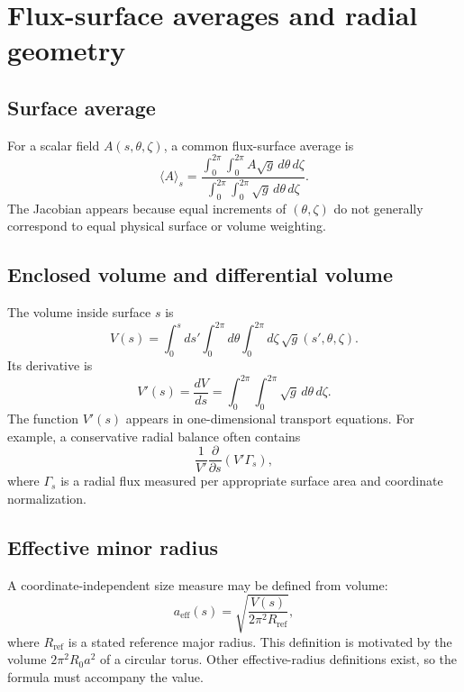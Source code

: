 \section{Flux-surface averages and radial geometry}
\label{sec:surface_averages}

\subsection{Surface average}
For a scalar field $A(s,\theta,\zeta)$, a common flux-surface average is
\begin{equation}
\langle A\rangle_s
=\frac{\displaystyle\int_0^{2\pi}\int_0^{2\pi}A\sqrt{g}\,d\theta\,d\zeta}
{\displaystyle\int_0^{2\pi}\int_0^{2\pi}\sqrt{g}\,d\theta\,d\zeta}.
\label{eq:flux_surface_average}
\end{equation}
The Jacobian appears because equal increments of $(\theta,\zeta)$ do not generally correspond to equal physical surface or volume weighting.

\subsection{Enclosed volume and differential volume}
The volume inside surface $s$ is
\begin{equation}
V(s)=\int_0^s ds'\int_0^{2\pi}d\theta\int_0^{2\pi}d\zeta\,\sqrt{g}(s',\theta,\zeta).
\label{eq:enclosed_volume}
\end{equation}
Its derivative is
\begin{equation}
V'(s)=\frac{dV}{ds}
=\int_0^{2\pi}\int_0^{2\pi}\sqrt{g}\,d\theta\,d\zeta.
\label{eq:Vprime}
\end{equation}
The function $V'(s)$ appears in one-dimensional transport equations. For example, a conservative radial balance often contains
\begin{equation}
\frac{1}{V'}\frac{\partial}{\partial s}\left(V'\Gamma_s\right),
\end{equation}
where $\Gamma_s$ is a radial flux measured per appropriate surface area and coordinate normalization.

\subsection{Effective minor radius}
A coordinate-independent size measure may be defined from volume:
\begin{equation}
a_{\mathrm{eff}}(s)=\sqrt{\frac{V(s)}{2\pi^2R_{\mathrm{ref}}}},
\end{equation}
where $R_{\mathrm{ref}}$ is a stated reference major radius. This definition is motivated by the volume $2\pi^2R_0a^2$ of a circular torus. Other effective-radius definitions exist, so the formula must accompany the value.

